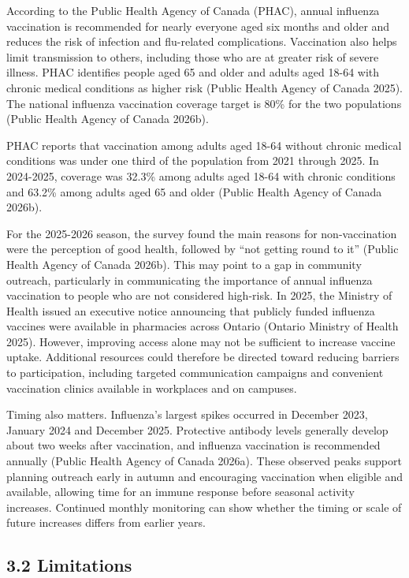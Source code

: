 \documentclass[
  letterpaper,
  DIV=11,
  numbers=noendperiod]{scrartcl}
\begin{document}
According to the Public Health Agency of Canada (PHAC), annual influenza
vaccination is recommended for nearly everyone aged six months and older
and reduces the risk of infection and flu-related complications.
Vaccination also helps limit transmission to others, including those who
are at greater risk of severe illness. PHAC identifies people aged 65
and older and adults aged 18-64 with chronic medical conditions as
higher risk (Public Health Agency of Canada 2025). The national
influenza vaccination coverage target is 80\% for the two populations
(Public Health Agency of Canada 2026b).

PHAC reports that vaccination among adults aged 18-64 without chronic
medical conditions was under one third of the population from 2021
through 2025. In 2024-2025, coverage was 32.3\% among adults aged 18-64
with chronic conditions and 63.2\% among adults aged 65 and older
(Public Health Agency of Canada 2026b).

For the 2025-2026 season, the survey found the main reasons for
non-vaccination were the perception of good health, followed by ``not
getting round to it'' (Public Health Agency of Canada 2026b). This may
point to a gap in community outreach, particularly in communicating the
importance of annual influenza vaccination to people who are not
considered high-risk. In 2025, the Ministry of Health issued an
executive notice announcing that publicly funded influenza vaccines were
available in pharmacies across Ontario (Ontario Ministry of Health
2025). However, improving access alone may not be sufficient to increase
vaccine uptake. Additional resources could therefore be directed toward
reducing barriers to participation, including targeted communication
campaigns and convenient vaccination clinics available in workplaces and
on campuses.

Timing also matters. Influenza's largest spikes occurred in December
2023, January 2024 and December 2025. Protective antibody levels
generally develop about two weeks after vaccination, and influenza
vaccination is recommended annually (Public Health Agency of Canada
2026a). These observed peaks support planning outreach early in autumn
and encouraging vaccination when eligible and available, allowing time
for an immune response before seasonal activity increases. Continued
monthly monitoring can show whether the timing or scale of future
increases differs from earlier years.

\subsection{3.2 Limitations}\label{limitations}
\end{document}
